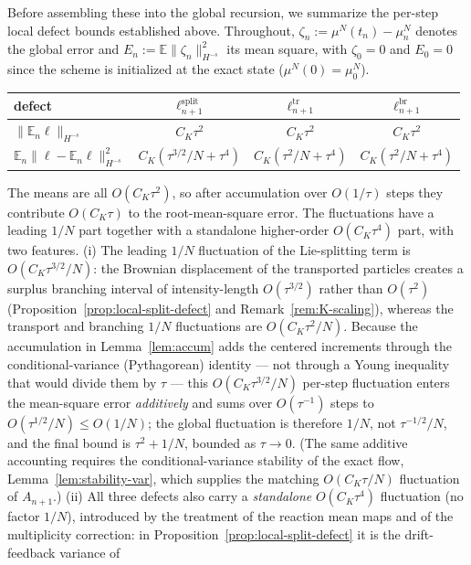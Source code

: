 \documentclass[a4paper,fleqn]{cas-sc}
\theoremstyle{definition}
\theoremstyle{remark}
\begin{document}
Before assembling these into the global recursion, we summarize the per-step local
defect bounds established above. Throughout, $\zeta_n:=\mu^N(t_n)-\mu^N_n$ denotes the
global error and $E_n:=\mathbb E\|\zeta_n\|_{H^{-s}}^2$ its mean square, with $\zeta_0=0$
and $E_0=0$ since the scheme is initialized at the exact state ($\mu^N(0)=\mu^N_0$).
\begin{center}
\renewcommand{\arraystretch}{1.4}
\begin{tabular}{lccc}
\hline
defect & $\ell^{\mathrm{split}}_{n+1}$ & $\ell^{\mathrm{tr}}_{n+1}$ & $\ell^{\mathrm{br}}_{n+1}$\\
\hline
$\|\mathbb E_n\ell\|_{H^{-s}}$ & $C_K\tau^2$ & $C_K\tau^2$ & $C_K\tau^2$\\
$\mathbb E_n\|\ell-\mathbb E_n\ell\|_{H^{-s}}^2$ & $C_K(\tau^{3/2}/N+\tau^4)$ & $C_K(\tau^2/N+\tau^4)$ & $C_K(\tau^2/N+\tau^4)$\\
\hline
\end{tabular}
\end{center}
The means are all $O(C_K\tau^2)$, so after accumulation over $O(1/\tau)$ steps they
contribute $O(C_K\tau)$ to the root-mean-square error. The fluctuations have a leading
$1/N$ part together with a standalone higher-order $O(C_K\tau^4)$ part, with two
features. (i) The leading $1/N$ fluctuation of the Lie-splitting term is
$O(C_K\tau^{3/2}/N)$: the Brownian displacement of the transported particles creates a
surplus branching interval of intensity-length $O(\tau^{3/2})$ rather than $O(\tau^2)$
(Proposition~\ref{prop:local-split-defect} and Remark~\ref{rem:K-scaling}), whereas the transport and
branching $1/N$ fluctuations are $O(C_K\tau^2/N)$. Because the accumulation in
Lemma~\ref{lem:accum} adds the centered increments through the conditional-variance
(Pythagorean) identity --- not through a Young inequality that would divide them by
$\tau$ --- this $O(C_K\tau^{3/2}/N)$ per-step fluctuation enters the mean-square error
\emph{additively} and sums over $O(\tau^{-1})$ steps to $O(\tau^{1/2}/N)\le O(1/N)$; the
global fluctuation is therefore $1/N$, not $\tau^{-1/2}/N$, and the final bound is
$\tau^2+1/N$, bounded as $\tau\to0$. (The same additive accounting requires the
conditional-variance stability of the exact flow, Lemma~\ref{lem:stability-var}, which
supplies the matching $O(C_K\tau/N)$ fluctuation of $A_{n+1}$.) (ii) All three defects also
carry a \emph{standalone} $O(C_K\tau^4)$ fluctuation (no factor $1/N$), introduced by
the treatment of the reaction mean maps and of the multiplicity correction: in
Proposition~\ref{prop:local-split-defect} it is the drift-feedback variance of
\end{document}
